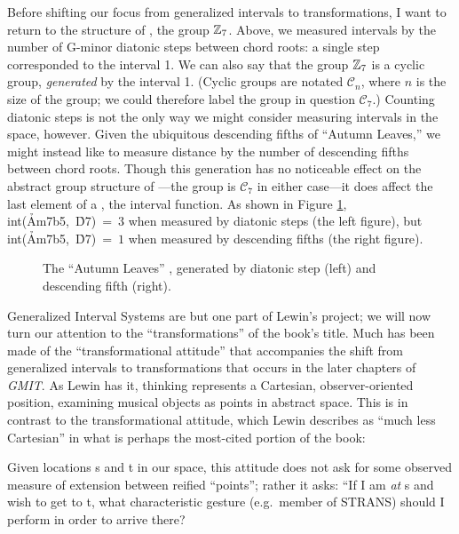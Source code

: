 Before shifting our focus from generalized intervals to transformations, I
want to return to the structure of \ivls{}, the group $\mathbb{Z}_7$. Above, we
measured intervals by the number of G-minor diatonic steps between chord
roots: a single step corresponded to the interval 1. We can also say that the
group $\mathbb{Z}_7$ is a cyclic group, \emph{generated} by the interval 1. (Cyclic
groups are notated $\mathcal{C}_n$, where $n$ is the size of the group; we
could therefore label the group in question $\mathcal{C}_7$.) Counting
diatonic steps is not the only way we might consider measuring intervals in
the space, however. Given the ubiquitous descending fifths of “Autumn Leaves,”
we might instead like to measure distance by the number of descending fifths
between chord roots. Though this generation has no noticeable effect on the
abstract group structure of \ivls{}---the group is $\mathcal{C}_7$ in either
case---it does affect the last element of a \gis{}, the interval
function. As shown in Figure \ref{ds:c7-generators},
\mbox{int(\h{Am7b5}, \h{D7}) = $3$} when measured by diatonic steps (the left
figure), but \mbox{int(\h{Am7b5}, \h{D7}) = $1$} when measured by descending fifths
(the right figure).

\begin{figure}
  \caption[The “Autumn Leaves” \gis{}, generated by diatonic step and descending
    fifth.]{The “Autumn Leaves” \gis{}, generated by diatonic step (left) and
    descending fifth (right).}
  \label{ds:c7-generators}
\end{figure}

Generalized Interval Systems are but one part of Lewin’s project; we will now
turn our attention to the “transformations” of the book’s title. Much has been
made of the “transformational attitude” that accompanies the shift from
generalized intervals to transformations that occurs in the later chapters of
\emph{GMIT}. As Lewin has it, \gis{} thinking represents a Cartesian,
observer-oriented position, examining musical objects as points in abstract
space. This is in contrast to the transformational attitude, which Lewin
describes as “much less Cartesian” in what is perhaps the most-cited portion
of the book:
\begin{quoting}
  \singlespacing
  Given locations s and t in our space, this attitude does not ask for some
  observed measure of extension between reified “points”; rather it asks: “If
  I am \emph{at} s and wish to get to t, what characteristic gesture
  (e.g.~member of STRANS) should I perform in order to arrive
  there?
\end{quoting}

